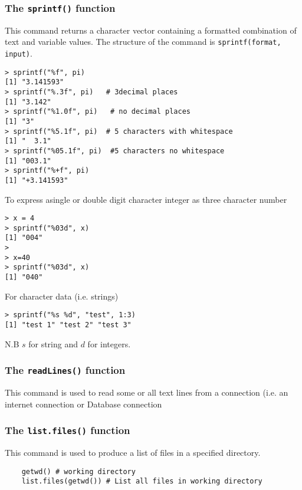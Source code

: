 \documentclass[12pt]{article}
\begin{document}
\subsubsection*{The \texttt{sprintf()} function}
This command returns a character vector containing a formatted combination of text and variable values. The structure of the command is \texttt{sprintf(format, input)}.
\begin{verbatim}
> sprintf("%f", pi)     
[1] "3.141593"
> sprintf("%.3f", pi)   # 3decimal places
[1] "3.142"
> sprintf("%1.0f", pi)   # no decimal places
[1] "3"
> sprintf("%5.1f", pi)  # 5 characters with whitespace
[1] "  3.1"  
> sprintf("%05.1f", pi)  #5 characters no whitespace
[1] "003.1"
> sprintf("%+f", pi)
[1] "+3.141593"
\end{verbatim}

\noindent To express asingle or double digit character integer as three character number
\begin{verbatim}
> x = 4
> sprintf("%03d", x)
[1] "004"
> 
> x=40
> sprintf("%03d", x)
[1] "040"
\end{verbatim}

\noindent For character data (i.e. strings) 
\begin{verbatim}
> sprintf("%s %d", "test", 1:3)
[1] "test 1" "test 2" "test 3"
\end{verbatim}
N.B $s$ for string and $d$ for integers.
\newpage
\subsubsection*{The \texttt{readLines()} function}

This command is used to read some or all text lines from a connection (i.e.
an internet connection or Database connection
\subsubsection*{The \texttt{list.files()} function}
This command is used to produce a list of files in a specified directory.
\begin{framed}
	\begin{verbatim}
	getwd() # working directory
	list.files(getwd()) # List all files in working directory
	\end{verbatim}
\end{framed}
\newpage
\end{document}
